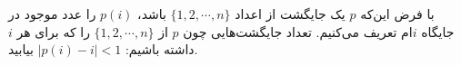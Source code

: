 \EXERCISE
با فرض این‌که
$p$
یک جایگشت از اعداد
$\{1, 2, \cdots, n\}$
باشد،
$p(i)$
را عدد موجود در جایگاه $i$ام تعریف می‌کنیم. تعداد جایگشت‌هایی چون
$p$
از
$\{1, 2, \cdots, n\}$
را که برای هر
$i$
داشته باشیم:
$|p(i) - i| < 1$
بیابید.